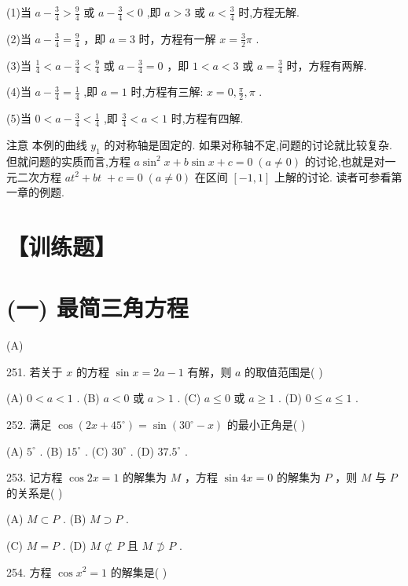 \documentclass[10pt]{article}
\begin{document}
(1)当 \(a - \frac{3}{4} > \frac{9}{4}\) 或 \(a - \frac{3}{4} < 0\) ,即 \(a > 3\) 或 \(a < \frac{3}{4}\) 时,方程无解.

(2)当 \(a - \frac{3}{4} = \frac{9}{4}\) ，即 \(a = 3\) 时，方程有一解 \(x = \frac{3}{2}\pi\) .

(3)当 \(\frac{1}{4} < a - \frac{3}{4} < \frac{9}{4}\) 或 \(a - \frac{3}{4} = 0\) ，即 \(1 < a < 3\) 或 \(a = \frac{3}{4}\) 时，方程有两解.

(4)当 \(a - \frac{3}{4} = \frac{1}{4}\) ,即 \(a = 1\) 时,方程有三解: \(x = 0,\frac{\pi }{2},\pi\) .

(5)当 \(0 < a - \frac{3}{4} < \frac{1}{4}\) ,即 \(\frac{3}{4} < a < 1\) 时,方程有四解.

注意 本例的曲线 \({y}_{1}\) 的对称轴是固定的. 如果对称轴不定,问题的讨论就比较复杂. 但就问题的实质而言,方程 \(a{\sin }^{2}x + b\sin x + c = 0\;\left( {a \neq  0}\right)\) 的讨论,也就是对一元二次方程 \(a{t}^{2} + {bt} \; + c = 0\;\left( {a \neq  0}\right)\) 在区间 \(\left\lbrack  {-1,1}\right\rbrack\) 上解的讨论. 读者可参看第一章的例题.

\section*{【训练题】}

\section*{(一) 最简三角方程}

(A)

251. 若关于 \(x\) 的方程 \(\sin x = {2a} - 1\) 有解，则 \(a\) 的取值范围是( )

(A) \(0 < a < 1\) . (B) \(a < 0\) 或 \(a > 1\) . (C) \(a \leq  0\) 或 \(a \geq  1\) . (D) \(0 \leq  a \leq  1\) .

252. 满足 \(\cos \left( {{2x} + {45}^{ \circ  }}\right)  = \sin \left( {{30}^{ \circ  } - x}\right)\) 的最小正角是( )

(A) \({5}^{ \circ  }\) . (B) \({15}^{ \circ  }\) . (C) \({30}^{ \circ  }\) . (D) \({37.5}^{ \circ  }\) .

253. 记方程 \(\cos {2x} = 1\) 的解集为 \(M\) ，方程 \(\sin {4x} = 0\) 的解集为 \(P\) ，则 \(M\) 与 \(P\) 的关系是( )

(A) \(M \subset  P\) . (B) \(M \supset  P\) .

(C) \(M = P\) . (D) \(M \text{ ⊄ } P\) 且 \(M \text{ ⊅ } P\) .

254. 方程 \(\cos {x}^{2} = 1\) 的解集是( )
\end{document}
